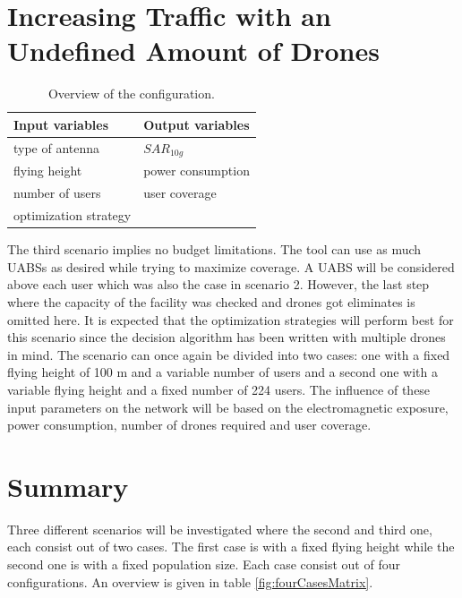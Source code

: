 \section{Increasing Traffic with an Undefined Amount of Drones}
\begin{table}[!htb]
      \centering
            \begin{tabular}{|l|l|}
            \hline
            \textbf{Input variables  }              & \textbf{Output variables}          \\   \hline 
            type of antenna                & $SAR_{10g}$               \\ 
            flying height                   & power consumption             \\ 
            number of users                & user coverage            \\ 
            optimization strategy           & \\
            \hline
            \end{tabular}
        \caption{Overview of the configuration.}
        \label{table:confOverviewScenario2}
\end{table}

The third scenario implies no budget limitations. The tool can use as much \gls{UABS}s as desired while trying to maximize coverage. 
A \gls{UABS} will be considered above each user which was also the case in scenario 2. However, the last step where the capacity of the facility
was checked and drones got eliminates is omitted here. It is expected that the optimization strategies will perform best for this scenario since the decision algorithm has been written with multiple drones in mind.
The scenario can once again be divided into two cases: one with a fixed flying height of 100 m and a variable number of users and a second one with 
a variable flying  height and a fixed number of 224 users.
The influence of these input parameters on the network will be based on the electromagnetic exposure, power consumption, number of drones required and user coverage.

\section{Summary}
Three different scenarios will be investigated where the second and third one, each consist out of two cases. The first case is with a fixed flying height while 
the second one is with a fixed population size. Each case consist out of four configurations. An overview is given in table \ref{fig:fourCasesMatrix}.

